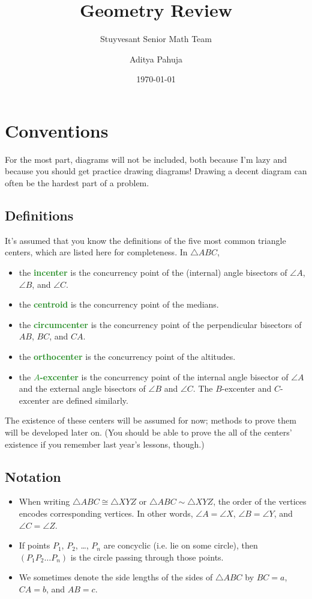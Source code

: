 \documentclass{scrartcl}
\title{Geometry Review}
\subtitle{Stuyvesant Senior Math Team}
\author{Aditya Pahuja}
\date{\today}
\providecommand{\ii}{\item}
\providecommand{\vocab}[1]{{\textbf{\textcolor{ForestGreen}{#1}}}}
\begin{document}
\maketitle
\tableofcontents
\pagebreak

\setcounter{section}{-1}
\section{Conventions}
For the most part, diagrams will not be included,
both because I'm lazy and because you should get practice drawing diagrams!
Drawing a decent diagram can often be the hardest part of a problem.

\subsection{Definitions}
It's assumed that you know the definitions of the five
most common triangle centers, which are listed here for completeness.
In $\triangle ABC$,
\begin{itemize}
	\ii the \vocab{incenter} is the concurrency point of the
	(internal) angle bisectors of $\angle A$, $\angle B$, and $\angle C$.
	\ii the \vocab{centroid} is the concurrency point of the medians.
	\ii the \vocab{circumcenter} is the concurrency point of the perpendicular
	bisectors of $AB$, $BC$, and $CA$.
	\ii the \vocab{orthocenter} is the concurrency point of the altitudes.
	\ii the \vocab{$A$-excenter} is the concurrency point of
	the internal angle bisector of $\angle A$ and
	the external angle bisectors of $\angle B$ and $\angle C$.
	The $B$-excenter and $C$-excenter are defined similarly.
\end{itemize}
The existence of these centers will be assumed for now;
methods to prove them will be developed later on.
(You should be able to prove the all of the centers' existence
if you remember last year's lessons, though.)
\subsection{Notation}
\begin{itemize}
	\ii When writing $\triangle ABC\cong\triangle XYZ$ or
	$\triangle ABC\sim\triangle XYZ$, the order of the vertices encodes
	corresponding vertices. In other words,
	$\angle A = \angle X$, $\angle B = \angle Y$, and $\angle C = \angle Z$.
	\ii If points $P_1$, $P_2$, \dots, $P_n$ are concyclic
	(i.e. lie on some circle), then
	$(P_1P_2\dots P_n)$ is the circle passing through those points.
	\ii We sometimes denote the side lengths of the sides of $\triangle ABC$ by
	$BC = a$, $CA = b$, and $AB = c$.
\end{itemize}
\pagebreak
\end{document}
